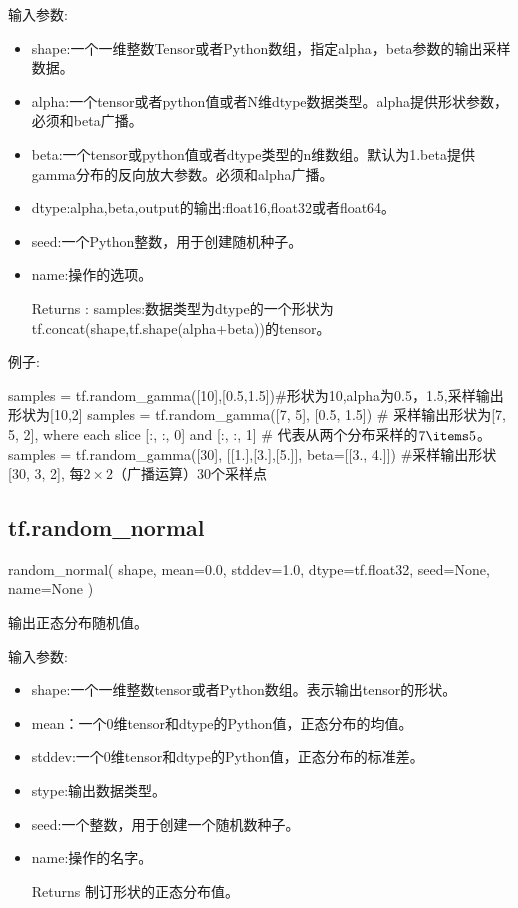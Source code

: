 输入参数:
\begin{itemize}
\item shape:一个一维整数Tensor或者Python数组，指定alpha，beta参数的输出采样数据。
\item alpha:一个tensor或者python值或者N维dtype数据类型。alpha提供形状参数，必须和beta广播。
\item beta:一个tensor或python值或者dtype类型的n维数组。默认为1.beta提供gamma分布的反向放大参数。必须和alpha广播。
\item dtype:alpha,beta,output的输出:float16,float32或者float64。
\item seed:一个Python整数，用于创建随机种子。
\item name:操作的选项。
\item[Returns]:
samples:数据类型为dtype的一个形状为tf.concat(shape,tf.shape(alpha+beta))的tensor。
\end{itemize}
例子:
\begin{python}
samples = tf.random_gamma([10],[0.5,1.5])#形状为10,alpha为0.5，1.5,采样输出形状为[10,2]
samples = tf.random_gamma([7, 5], [0.5, 1.5]) # 采样输出形状为[7, 5, 2], where each slice [:, :, 0] and [:, :, 1] # 代表从两个分布采样的$7\items5$。
samples = tf.random_gamma([30], [[1.],[3.],[5.]], beta=[[3., 4.]]) #采样输出形状[30, 3, 2], 每$2\times2$（广播运算）30个采样点
\end{python}
\subsection{tf.random\_normal}
\begin{python}
random_normal(
    shape,
    mean=0.0,
    stddev=1.0,
    dtype=tf.float32,
    seed=None,
    name=None
)
\end{python}
输出正态分布随机值。

输入参数:
\begin{itemize}
\item shape:一个一维整数tensor或者Python数组。表示输出tensor的形状。
\item mean：一个0维tensor和dtype的Python值，正态分布的均值。
\item stddev:一个0维tensor和dtype的Python值，正态分布的标准差。
\item stype:输出数据类型。
\item seed:一个整数，用于创建一个随机数种子。
\item name:操作的名字。
\item[Returns] 制订形状的正态分布值。
\end{itemize}
